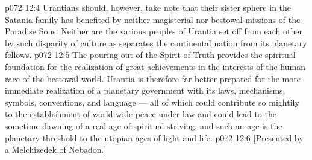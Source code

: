 \vs p072 12:4 \pc Urantians should, however, take note that their sister sphere in the Satania family has benefited by neither magisterial nor bestowal missions of the Paradise Sons. Neither are the various peoples of Urantia set off from each other by such disparity of culture as separates the continental nation from its planetary fellows.
\vs p072 12:5 The pouring out of the Spirit of Truth provides the spiritual foundation for the realization of great achievements in the interests of the human race of the bestowal world. Urantia is therefore far better prepared for the more immediate realization of a planetary government with its laws, mechanisms, symbols, conventions, and language --- all of which could contribute so mightily to the establishment of world\hyp{}wide peace under law and could lead to the sometime dawning of a real age of spiritual striving; and such an age is the planetary threshold to the utopian ages of light and life.
\vsetoff
\vs p072 12:6 [Presented by a Melchizedek of Nebadon.]
\quizlink
